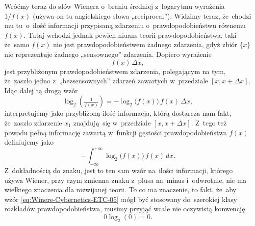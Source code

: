 \documentclass[a4paper,11pt]{article}
\numberwithin{equation}{section}
\begin{document}
Wróćmy teraz do słów Wienera o~braniu średniej z~logarytmu wyrażenia
$1 / f( x )$ (używa on tu angielskiego słowa „reciprocal”). Widzimy teraz,
że~chodzi mu tu~o~ilość informacji przypisaną zdarzeniu o~prawdopodobieństwu
równemu $f( x )$. Tutaj wchodzi jednak pewien niuans teorii
prawdopodobieństwa, taki że~samo $f( x )$ nie jest prawdopodobieństwem
żadnego zdarzenia, gdyż zbiór $\{ x \}$ nie reprezentuje żadnego „sensownego”
zdarzenia. Dopiero wyrażenie
\begin{equation}
  \label{eq:Winere-Cybernetics-ETC-03}
  f( x ) \, \Delta x,
\end{equation}
jest przybliżonym prawdopodobieństwem zdarzenia, polegającym na tym,
że~zaszło jedno z~„bezsensownych” zdarzeń zawartych w~przedziale
$[ x, x + \Delta x ]$. Idąc dalej tą drogą wzór
\begin{equation}
  \label{eq:Winere-Cybernetics-ETC-04}
  \log_{ 2 }\!\left( \tfrac{ 1 }{ f( x ) } \right) =
  -\log_{ 2 }\!\big( f( x ) \big) \, f( x ) \, \Delta x,
\end{equation}
interpretujemy jako przybliżoną ilość informacja, którą dostarcza nam
fakt, że~zaszło zdarzenie $x_{ 1 }$ znajdują~się w~przedziale
$[ x, x + \Delta x ]$. Z~tego też powodu pełną informację zawartą w~funkcji
gęstości prawdopodobieństwa $f( x )$ definiujemy jako
\begin{equation}
  \label{eq:Winere-Cybernetics-ETC-05}
  -\int_{ -\infty }^{ +\infty } \log_{ 2 }\!\big( f( x ) \big) \, f( x ) \, dx.
\end{equation}
Z~dokładnością do znaku, jest to ten sam wzór na~ilości informacji,
którego używa Wiener, przy czym zmienna znaku z~plusa na~minus i~odwrotnie,
nie ma wielkiego znaczenia dla rozwijanej teorii. To co ma znaczenie, to
fakt, że~aby wzór \eqref{eq:Winere-Cybernetics-ETC-05} mógł być stosowany
do~szerokiej klasy rozkładów prawdopodobieństwa, musimy przyjąć wcale nie
oczywistą konwencję
\begin{equation}
  \label{eq:Winere-Cybernetics-ETC-06}
  0 \log_{ 2 }( 0 ) = 0.
\end{equation}

\VerSpaceFour
\end{document}
